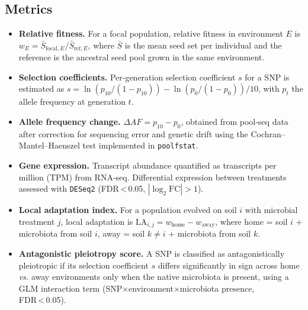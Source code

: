 \documentclass{article}
\begin{document}
\subsection{Metrics}
\begin{itemize}
  \item \textbf{Relative fitness.} For a focal population, relative fitness in environment $E$ is $w_E = \bar{S}_{\text{focal},E} / \bar{S}_{\text{ref},E}$, where $\bar{S}$ is the mean seed set per individual and the reference is the ancestral seed pool grown in the same environment.
  \item \textbf{Selection coefficients.} Per‑generation selection coefficient $s$ for a SNP is estimated as $s = \ln(p_{10} / (1-p_{10})) - \ln(p_0 / (1-p_0)) / 10$, with $p_t$ the allele frequency at generation $t$.
  \item \textbf{Allele frequency change.} $\Delta AF = p_{10} - p_0$, obtained from pool‑seq data after correction for sequencing error and genetic drift using the Cochran–Mantel–Haenszel test implemented in \texttt{poolfstat}.
  \item \textbf{Gene expression.} Transcript abundance quantified as transcripts per million (TPM) from RNA‑seq. Differential expression between treatments assessed with \texttt{DESeq2} (FDR < 0.05, $|\log_2\text{FC}| > 1$).
  \item \textbf{Local adaptation index.} For a population evolved on soil $i$ with microbial treatment $j$, local adaptation is $\text{LA}_{i,j} = w_{\text{home}} - w_{\text{away}}$, where home = soil $i$ + microbiota from soil $i$, away = soil $k \neq i$ + microbiota from soil $k$.
  \item \textbf{Antagonistic pleiotropy score.} A SNP is classified as antagonistically pleiotropic if its selection coefficient $s$ differs significantly in sign across home \textit{vs.} away environments only when the native microbiota is present, using a GLM interaction term (SNP×environment×microbiota presence, FDR < 0.05).
\end{itemize}
\end{document}
